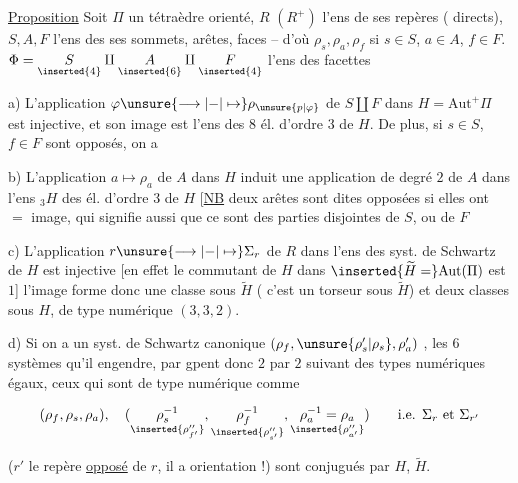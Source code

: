 
\uline{Proposition} Soit $\Pi$ un tétraèdre orienté, $R$ $(R^{+})$ l'ens de ses repères ( directs), $S,A,F$ l'ens des ses sommets, arêtes, faces -- d'où $\rho_s,\rho_a,\rho_f$ si $s\in S$, $a\in A$, $f\in F$.  $\Phi=\underset{\inserted{4}}S\amalg\underset{\inserted{6}}A\amalg\underset{\inserted{4}}F$ l'ens des facettes


a) L'application $\varphi\unsure{\longrightarrow|\mathord{-}|\mapsto}\rho_{\unsure{p|\varphi}}$ de $S\amalg F$ dans $H=\mathrm{Aut}^{+}\Pi$ est injective, et son image est l'ens des $8$ él. d'ordre $3$ de $H$. De plus, si $s\in S$, $f\in F$ sont opposés, on a 

b) L'application $a\longmapsto\rho_a$ de $A$ dans $H$ induit une application de degré $2$ de $A$ dans  l'ens $ {}_3H$ des él. d'ordre $3$ de $H$ [\uline{NB} deux arêtes sont dites opposées si elles ont $=$ image,  qui signifie aussi que ce sont des parties disjointes de $S$, ou de $F$\unsure{]|.}

c) L'application $r\unsure{\longrightarrow|\mathord{-}|\mapsto}\Sigma_r$ de $R$ dans l'ens des syst. de Schwartz de $H$ est injective [en effet le commutant de $H$ dans $\inserted{\widetilde H=}\mathrm{Aut}(\Pi)$ est $1$] l'image forme donc une classe sous $\widetilde H$ ( c'est un torseur sous $\widetilde H$) et deux classes sous $H$, de type numérique $(3,3,2)$.


\margin{[celà fait $72=36+36$ en transformant par $\unsure{\mathfrak S_3|\mathcal S_3}$, deux paquets de $36$ syst. de Schwartz, \deleted{\unsure{chacun des} paquets de $72$ est stable par $\mathfrak S_3$ \unsure{et} \illegible{1}} stables sous $\mathfrak S_3\times H$}

d) Si on a un syst. de Schwartz canonique $(\rho_f,\unsure{\rho'_s|\rho_s},\rho'_a)$ , les $6$ systèmes qu'il engendre, par     gpent donc $2$ par $2$ suivant des  types numériques égaux, ceux qui sont de type numérique comme

\[
(\rho_f,\rho_s,\rho_a),\quad
(\underset{\inserted{\rho''_{f'}}}{\rho_s^{-1}},
 \underset{\inserted{\rho''_{s'}}}{\rho_f^{-1}},
 \underset{\inserted{\rho''_{a'}}}{\rho_a^{-1}=\rho_a})
\qquad\text{i.e. }\Sigma_r\text{ et }\Sigma_{r'}
\]

($r'$ le repère \uline{opposé} de $r$, il  a \uuline{$=$} orientation !)  sont  conjugués par $H$,   $\widetilde H$. 

